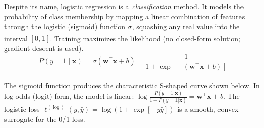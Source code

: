 \begin{tcbitemize}[ skin=sectionraster, halign lower=center ]
    \tcbitem[title={Logistic Regression as a Classification Model}, raster multicolumn=3]
    Despite its name, logistic regression is a \emph{classification} method. It models the probability of class membership by mapping a linear combination of features through the logistic (sigmoid) function $\sigma$, squashing any real value into the interval $[0, 1]$\textsuperscript{\cite[][pp.~89--90]{iiiCourseMachineLearning}}. Training maximizes the likelihood (no closed-form solution; gradient descent is used).
    \tcblower
    \begin{equation}
        P(y = 1 \mid \mathbf{x}) = \sigma\!\left(\mathbf{w}^\top \mathbf{x} + b\right) = \frac{1}{1 + \exp\!\left[-\!\left(\mathbf{w}^\top \mathbf{x} + b\right)\right]}
    \end{equation}

    \tcbitem[title={The Sigmoid Curve and Log-Odds}, raster multicolumn=3]
    The sigmoid function produces the characteristic S-shaped curve shown below\textsuperscript{\cite[][p.89]{iiiCourseMachineLearning}}. In log-odds (logit) form, the model is linear: $\log\frac{P(y=1|\mathbf{x})}{1-P(y=1|\mathbf{x})} = \mathbf{w}^\top\mathbf{x} + b$. The logistic loss $\ell^{(\log)}(y,\hat{y}) = \log(1 + \exp[-y\hat{y}])$ is a smooth, convex surrogate for the 0/1 loss.
    \tcblower
\end{tcbitemize}

